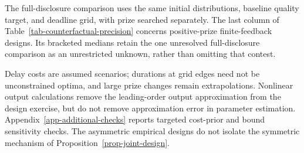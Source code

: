 The full-disclosure comparison uses the same initial distributions, baseline quality target, and deadline grid, with prize searched separately. The last column of Table~\ref{tab-counterfactual-precision} concerns positive-prize finite-feedback designs. Its bracketed medians retain the one unresolved full-disclosure comparison as an unrestricted unknown, rather than omitting that contest.

Delay costs are assumed scenarios; durations at grid edges need not be unconstrained optima, and large prize changes remain extrapolations. Nonlinear output calculations remove the leading-order output approximation from the design exercise, but do not remove approximation error in parameter estimation. Appendix~\ref{app-additional-checks} reports targeted cost-prior and bound sensitivity checks. The asymmetric empirical designs do not isolate the symmetric mechanism of Proposition~\ref{prop-joint-design}.
